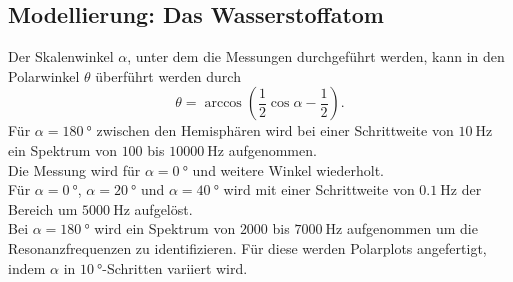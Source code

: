 \subsection{Modellierung: Das Wasserstoffatom}

Der Skalenwinkel $\alpha$, unter dem die Messungen durchgeführt werden, kann in den Polarwinkel $\theta$ überführt werden durch
\begin{equation}
\theta=\arccos{\left(\frac{1}{2}\cos{\alpha}-\frac{1}{2}\right)}\text{.}\label{eq:theta}
\end{equation}
\newline
Für $\alpha=\SI{180}{\degree}$ zwischen den Hemisphären wird bei einer Schrittweite von $\SI{10}{\hertz}$ ein Spektrum von $100$ bis $\SI{10000}{\hertz}$ aufgenommen.\\
Die Messung wird für $\alpha=\SI{0}{\degree}$ und weitere Winkel wiederholt.\\
Für $\alpha=\SI{0}{\degree}$, $\alpha=\SI{20}{\degree}$ und $\alpha=\SI{40}{\degree}$ wird mit einer Schrittweite von $\SI{0,1}{\hertz}$ der Bereich um $\SI{5000}{\hertz}$ aufgelöst.\\
Bei $\alpha=\SI{180}{\degree}$ wird ein Spektrum von $2000$ bis $\SI{7000}{\hertz}$ aufgenommen um die Resonanzfrequenzen zu identifizieren.
Für diese werden Polarplots angefertigt, indem $\alpha$ in $\SI{10}{\degree}$-Schritten variiert wird.

